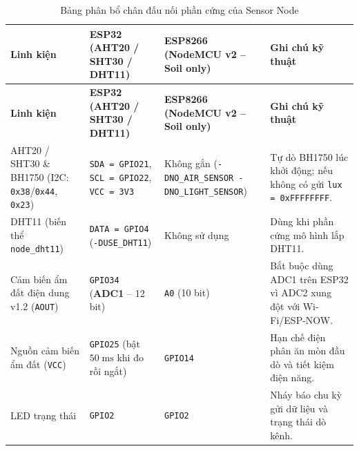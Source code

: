 \begingroup
\footnotesize
\setlength{\tabcolsep}{3.5pt}
\renewcommand{\arraystretch}{1.12}
\begin{longtable}{|>{\raggedright\arraybackslash}p{}|>{\raggedright\arraybackslash}p{}|>{\raggedright\arraybackslash}p{}|>{\raggedright\arraybackslash}p{}|}
\caption{Bảng phân bổ chân đấu nối phần cứng của Sensor Node}\label{tab:node-wiring}\\
\hline
\textbf{Linh kiện} & \textbf{ESP32 (AHT20 / SHT30 / DHT11)} & \textbf{ESP8266 (NodeMCU v2 -- Soil only)} & \textbf{Ghi chú kỹ thuật} \\
\hline
\endfirsthead
\hline
\textbf{Linh kiện} & \textbf{ESP32 (AHT20 / SHT30 / DHT11)} & \textbf{ESP8266 (NodeMCU v2 -- Soil only)} & \textbf{Ghi chú kỹ thuật} \\
\hline
\endhead
AHT20 / SHT30 \& BH1750 (I2C: \texttt{0x38}/\texttt{0x44}, \texttt{0x23}) & \texttt{SDA = GPIO21}, \texttt{SCL = GPIO22}, \texttt{VCC = 3V3} & Không gắn (\texttt{-DNO\_AIR\_SENSOR -DNO\_LIGHT\_SENSOR}) & Tự dò BH1750 lúc khởi động; nếu không có gửi \texttt{lux = 0xFFFFFFFF}. \\
\hline
DHT11 (biến thể \texttt{node\_dht11}) & \texttt{DATA = GPIO4} (\texttt{-DUSE\_DHT11}) & Không sử dụng & Dùng khi phần cứng mô hình lắp DHT11. \\
\hline
Cảm biến ẩm đất điện dung v1.2 (\texttt{AOUT}) & \texttt{GPIO34} (\textbf{ADC1} -- 12 bit) & \texttt{A0} (10 bit) & Bắt buộc dùng ADC1 trên ESP32 vì ADC2 xung đột với Wi-Fi/ESP-NOW. \\
\hline
Nguồn cảm biến ẩm đất (\texttt{VCC}) & \texttt{GPIO25} (bật \(50\;\text{ms}\) khi đo rồi ngắt) & \texttt{GPIO14} & Hạn chế điện phân ăn mòn đầu dò và tiết kiệm điện năng. \\
\hline
LED trạng thái & \texttt{GPIO2} & \texttt{GPIO2} & Nháy báo chu kỳ gửi dữ liệu và trạng thái dò kênh. \\
\hline
\end{longtable}
\endgroup

